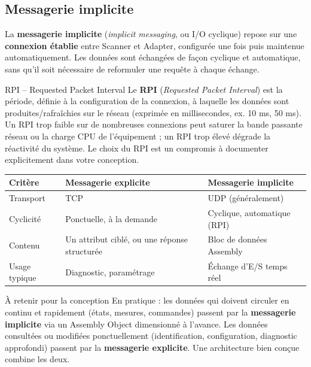 \subsection{Messagerie implicite}
La \textbf{messagerie implicite} (\emph{implicit messaging}, ou I/O cyclique) repose sur une \textbf{connexion établie} entre Scanner et Adapter, configurée une fois puis maintenue automatiquement. Les données sont échangées de façon cyclique et automatique, sans qu'il soit nécessaire de reformuler une requête à chaque échange.

\begin{UPSTIidee}{RPI -- Requested Packet Interval}
    Le \textbf{RPI} (\emph{Requested Packet Interval}) est la période, définie à la configuration de la connexion, à laquelle les données sont produites/rafraîchies sur le réseau (exprimée en millisecondes, ex. 10 ms, 50 ms). Un RPI trop faible sur de nombreuses connexions peut saturer la bande passante réseau ou la charge CPU de l'équipement ; un RPI trop élevé dégrade la réactivité du système. Le choix du RPI est un compromis à documenter explicitement dans votre conception.
\end{UPSTIidee}

\begin{center}
    \begin{tabular}{|p{5cm}|p{4.2cm}|p{4.2cm}|}
        \hline
        \textbf{Critère} & \textbf{Messagerie explicite} & \textbf{Messagerie implicite} \\
        \hline
        Transport & TCP & UDP (généralement) \\
        \hline
        Cyclicité & Ponctuelle, à la demande & Cyclique, automatique (RPI) \\
        \hline
        Contenu & Un attribut ciblé, ou une réponse structurée & Bloc de données Assembly \\
        \hline
        Usage typique & Diagnostic, paramétrage & Échange d'E/S temps réel \\
        \hline
    \end{tabular}
\end{center}

\begin{UPSTIidee}{À retenir pour la conception}
    En pratique : les données qui doivent circuler en continu et rapidement (états, mesures, commandes) passent par la \textbf{messagerie implicite} via un Assembly Object dimensionné à l'avance. Les données consultées ou modifiées ponctuellement (identification, configuration, diagnostic approfondi) passent par la \textbf{messagerie explicite}. Une architecture bien conçue combine les deux.
\end{UPSTIidee}
